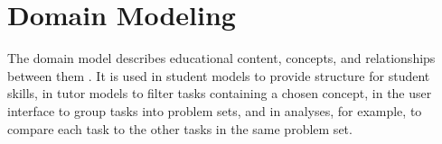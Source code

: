 

\section{Domain Modeling}
\label{sec:domain-modeling}

The domain model describes educational content, concepts, and relationships
between them
\cite{its-domain-models}.
It is used in student models to provide structure
for student skills, in tutor models to filter tasks containing a chosen
concept, in the user interface to group tasks into problem sets, and in
analyses, for example, to compare each task to the other tasks in the same problem set.

